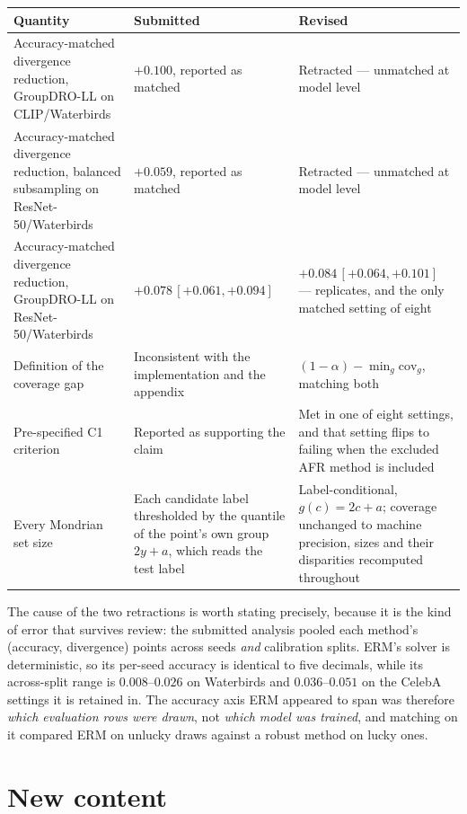 \documentclass[11pt,a4paper]{article}
\newcommand{\was}[1]{\textcolor{cutred}{#1}}
\newcommand{\now}[1]{\textcolor{addblue}{#1}}
\begin{document}
\begin{center}
\begin{tabular}{@{}L{5.0cm}L{4.4cm}L{4.8cm}@{}}
\toprule
\textbf{Quantity} & \textbf{Submitted} & \textbf{Revised} \\
\midrule
Accuracy-matched divergence reduction, GroupDRO-LL on CLIP/Waterbirds &
\was{$+0.100$, reported as matched} &
\now{Retracted --- unmatched at model level} \\
\addlinespace
Accuracy-matched divergence reduction, balanced subsampling on ResNet-50/Waterbirds &
\was{$+0.059$, reported as matched} &
\now{Retracted --- unmatched at model level} \\
\addlinespace
Accuracy-matched divergence reduction, GroupDRO-LL on ResNet-50/Waterbirds &
\was{$+0.078\,[+0.061,+0.094]$} &
\now{$+0.084\,[+0.064,+0.101]$ --- replicates, and the only matched setting of eight} \\
\addlinespace
Definition of the coverage gap &
\was{Inconsistent with the implementation and the appendix} &
\now{$(1-\alpha)-\min_g \mathrm{cov}_g$, matching both} \\
\addlinespace
Pre-specified C1 criterion &
\was{Reported as supporting the claim} &
\now{Met in one of eight settings, and that setting flips to failing when the excluded AFR method is included}
\\
\addlinespace
Every Mondrian set size &
\was{Each candidate label thresholded by the quantile of the point's own group $2y+a$, which reads
the test label} &
\now{Label-conditional, $g(c)=2c+a$; coverage unchanged to machine precision, sizes and their
disparities recomputed throughout}
\\
\bottomrule
\end{tabular}
\end{center}

The cause of the two retractions is worth stating precisely, because it is the kind of error that
survives review: the submitted analysis pooled each method's (accuracy, divergence) points across
seeds \emph{and} calibration splits. ERM's solver is deterministic, so its per-seed accuracy is
identical to five decimals, while its across-split range is $0.008$--$0.026$ on Waterbirds and
$0.036$--$0.051$ on the CelebA settings it is retained in. The accuracy axis ERM
appeared to span was therefore \emph{which evaluation rows were drawn}, not \emph{which model was
trained}, and matching on it compared ERM on unlucky draws against a robust method on lucky ones.

\section{New content}
\end{document}
